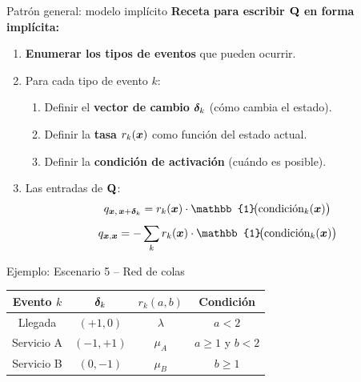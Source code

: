 \documentclass[aspectratio=1610, 9pt]{beamer}
\begin{document}
\begin{frame}{Patr\'on general: modelo impl\'icito}
\textbf{Receta para escribir $\mathbf{Q}$ en forma impl\'icita:}

\begin{enumerate}
    \item \textbf{Enumerar los tipos de eventos} que pueden ocurrir.
    \item Para cada tipo de evento $k$:
    \begin{enumerate}
        \item[(a)] Definir el \textbf{vector de cambio} $\boldsymbol{\delta}_k$ (c\'omo cambia el estado).
        \item[(b)] Definir la \textbf{tasa} $r_k(\boldsymbol{x})$ como funci\'on del estado actual.
        \item[(c)] Definir la \textbf{condici\'on de activaci\'on} (cu\'ando es posible).
    \end{enumerate}
    \item Las entradas de $\mathbf{Q}$:
    \[
    q_{\vect{x},\,\vect{x}+\vect{\delta}_k} = r_k(\vect{x}) \cdot \mathbb{1}\!\big(\text{condici\'on}_k(\vect{x})\big)
    \]
    \[
    q_{\vect{x},\vect{x}} = -\sum_{k} r_k(\vect{x}) \cdot \mathbb{1}\!\big(\text{condici\'on}_k(\vect{x})\big)
    \]
\end{enumerate}

\vspace{4pt}
\begin{exampleblock}{Ejemplo: Escenario 5 -- Red de colas}
\footnotesize
\begin{tabular}{cccc}
\toprule
Evento $k$ & $\boldsymbol{\delta}_k$ & $r_k(a,b)$ & Condici\'on \\
\midrule
Llegada   & $(+1, 0)$ & $\lambda$ & $a < 2$ \\
Servicio A & $(-1, +1)$ & $\mu_A$ & $a \ge 1$ y $b < 2$ \\
Servicio B & $(0, -1)$ & $\mu_B$ & $b \ge 1$ \\
\bottomrule
\end{tabular}
\end{exampleblock}
\end{frame}
\end{document}
